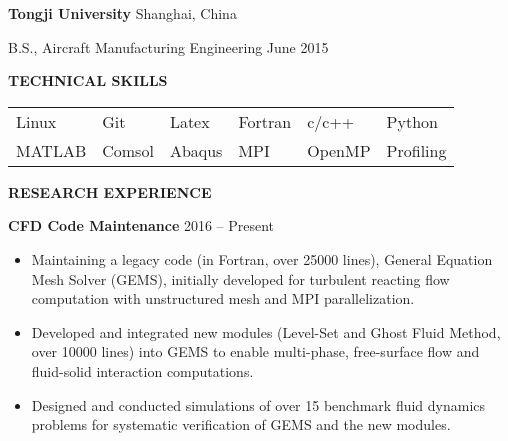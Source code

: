 \documentclass[11pt, letterpaper]{article}
\begin{document}
\textbf{Tongji University} 
\hfill
Shanghai, China

B.S., Aircraft Manufacturing Engineering \hfill June 2015

\vskip 9pt

% 
% 

\textbf{TECHNICAL SKILLS}

\fullrule

\begin{tabular}{@{} l l l l l l @{}}
   Linux & Git & Latex & Fortran & c/c++ & Python \\
   MATLAB & Comsol & Abaqus & MPI & OpenMP & Profiling
\end{tabular}

\vspace{9pt}

\textbf{RESEARCH EXPERIENCE}

\fullrule

\textbf{CFD Code Maintenance} \hfill 2016 -- Present
\begin{itemize}[leftmargin=*, labelsep=5mm]
   \item Maintaining a legacy code (in Fortran, over 25000 lines), General Equation Mesh Solver
      (GEMS), initially developed for turbulent reacting flow computation with unstructured mesh and
      MPI parallelization.
   \item Developed and integrated new modules (Level-Set and Ghost Fluid Method, over 10000 lines)
      into GEMS to enable multi-phase, free-surface flow and fluid-solid interaction computations.
   \item Designed and conducted simulations of over 15 benchmark fluid dynamics
      problems for systematic verification of GEMS and the new modules.
\end{itemize}

\vspace{3pt}
\end{document}
